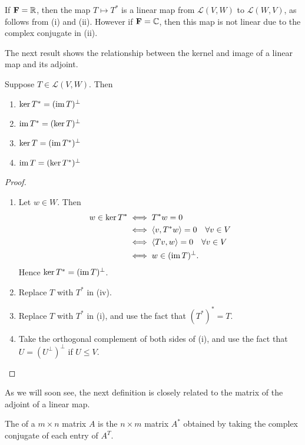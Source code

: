If $\mathbf F=\mathbb R$, then the map $T\mapsto T^*$ is a linear map from $\mathcal{L}(V,W)$ to $\mathcal{L}(W,V)$, as follows from (i) and (ii). However if $\mathbf F=\mathbb C$, then this map is not linear due to the complex conjugate in (ii).

The next result shows the relationship between the kernel and image of a linear map and its adjoint.

\begin{lemma}\label{lemma:kernel-image-adjoint}
Suppose $T\in\mathcal{L}(V,W)$. Then
\begin{enumerate}[label=(\roman*)]
\item $\ker T^*=(\operatorname{im} T)^\perp$
\item $\operatorname{im} T^*=(\ker T)^\perp$
\item $\ker T=(\operatorname{im} T^*)^\perp$
\item $\operatorname{im} T=(\ker T^*)^\perp$
\end{enumerate}
\end{lemma}

\begin{proof} \
\begin{enumerate}[label=(\roman*)]
\item Let $w\in W$. Then
\begin{align*}
w\in\ker T^*
&\iff T^*w=0\\
&\iff\left\langle v,T^*w\right\rangle=0\quad\forall v\in V\\
&\iff\left\langle Tv,w\right\rangle=0\quad\forall v\in V\\
&\iff w\in(\operatorname{im} T)^\perp.
\end{align*}
Hence $\ker T^*=(\operatorname{im} T)^\perp$.

\item Replace $T$ with $T^*$ in (iv).

\item Replace $T$ with $T^*$ in (i), and use the fact that $(T^*)^*=T$.

\item Take the orthogonal complement of both sides of (i), and use the fact that $U=(U^\perp)^\perp$ if $U\le V$.
\end{enumerate}
\end{proof}

As we will soon see, the next definition is closely related to the matrix of the adjoint of a linear map.

\begin{definition}
The  of a $m\times n$ matrix $A$ is the $n\times m$ matrix $A^*$ obtained by taking the complex conjugate of each entry of $A^T$.
\end{definition}

